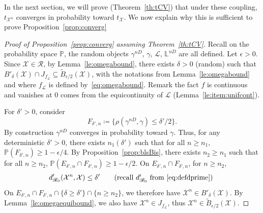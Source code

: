 \documentclass[11pt]{article}
\def\Conf{{\mathscr{R}}}
\begin{document}
In the next section, we will prove (Theorem~\ref{th:tCV}) that under these coupling, $t_{\mathcal{X}^n}$ converges in probability toward $t_\mathcal{X}$. We now explain why this is sufficient to prove Proposition~\ref{prop:converg}
\begin{proof}[Proof of Proposition~\ref{prop:converg} assuming Theorem~\ref{th:tCV}]
  Recall on the probability space $\mathbb{P}$, the random objects $\gamma^{nD}$, $\gamma$, $\mathcal{L}$, $\mathbb{L}^{nD}$ are all defined. Let $\epsilon>0$. Since $\mathcal{X}\in \Conf$, by Lemma~\ref{le:omegabound}, there exists $\delta>0$ (random) such that
  $B'_\delta(\mathcal{X})\cap J_{f_{\mathcal{L}}}\subseteq \tilde{B}_{\epsilon/2}(\mathcal{X})$, with the notations from Lemma~\ref{le:omegabound} and where
  $f_{\mathcal{L}}$ is defined by~\eqref{eq:omegabound}. Remark the fact $f$ is continuous and vanishes at $0$ comes from the equicontinuity of $\mathcal{L}$ (Lemma~\ref{le:item:unifcont}).

  For $\delta'>0$, consider \[F_{\delta',n} \coloneqq \{ \rho(\gamma^{nD}, \gamma)\leq \delta'/2\}.%
  \]
  By construction $\gamma^{nD}$ converges in probability toward $\gamma$. %
  Thus, for any deterministic $\delta'>0$, there exists $n_1(\delta')$ such that for all $n\geq n_1$, $\mathbb{P}(F_{\delta',n} )\geq 1-\epsilon/4$. By Proposition~\ref{prop:blsBis}, there exists $n_2\geq n_1$ such that for all $n\geq n_2$,
  $\mathbb{P}(E_{\delta',n}\cap F_{\delta',n} )\geq 1-\epsilon/2$.
  On $ E_{\delta',n} \cap F_{\delta',n}$, for $n\geq  n_2$,
  \[
  d'_{\Conf_0}( \mathcal{X}^n, \mathcal{X})\leq \delta' \qquad \mbox{(recall $d'_{\Conf_0}$ from~\eqref{eq:defdprime}) }
  \]
  On $E_{\delta',n} \cap F_{\delta',n}\cap \{  \delta\geq \delta' \}\cap\{ n\geq n_2\}$, we therefore have $\mathcal{X}^n\in B'_\delta(\mathcal{X})$. By Lemma~\ref{le:omegaequibound}, we also have $\mathcal{X}^n\in J_{f_{\mathcal{L}}} $, thus $\mathcal{X}^n\in  \tilde{B}_{\epsilon/2}(\mathcal{X})$.


\end{proof}
\end{document}
